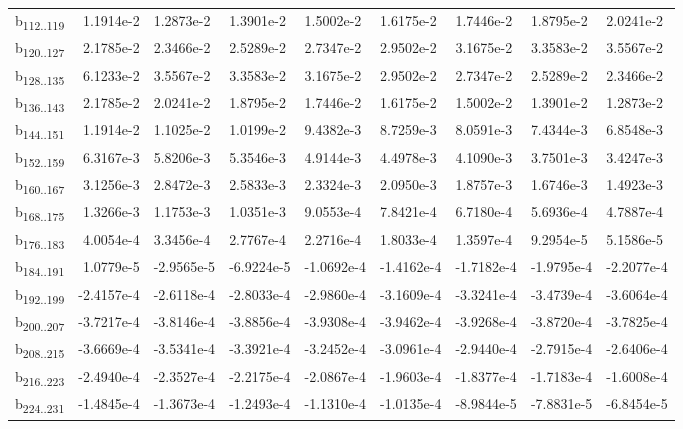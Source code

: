 \begin{table}
{\begin{tabular}{lrlllllll}
        b\textsubscript{112..119} & 1.1914e-2 & 1.2873e-2 & 1.3901e-2 & 1.5002e-2 & 1.6175e-2 & 1.7446e-2 & 1.8795e-2 & 2.0241e-2 \\
        b\textsubscript{120..127} & 2.1785e-2 & 2.3466e-2 & 2.5289e-2 & 2.7347e-2 & 2.9502e-2 & 3.1675e-2 & 3.3583e-2 & 3.5567e-2 \\
        b\textsubscript{128..135} & 6.1233e-2 & 3.5567e-2 & 3.3583e-2 & 3.1675e-2 & 2.9502e-2 & 2.7347e-2 & 2.5289e-2 & 2.3466e-2 \\
        b\textsubscript{136..143} & 2.1785e-2 & 2.0241e-2 & 1.8795e-2 & 1.7446e-2 & 1.6175e-2 & 1.5002e-2 & 1.3901e-2 & 1.2873e-2 \\
        b\textsubscript{144..151} & 1.1914e-2 & 1.1025e-2 & 1.0199e-2 & 9.4382e-3 & 8.7259e-3 & 8.0591e-3 & 7.4344e-3 & 6.8548e-3 \\
        b\textsubscript{152..159} & 6.3167e-3 & 5.8206e-3 & 5.3546e-3 & 4.9144e-3 & 4.4978e-3 & 4.1090e-3 & 3.7501e-3 & 3.4247e-3 \\
        b\textsubscript{160..167} & 3.1256e-3 & 2.8472e-3 & 2.5833e-3 & 2.3324e-3 & 2.0950e-3 & 1.8757e-3 & 1.6746e-3 & 1.4923e-3 \\
        b\textsubscript{168..175} & 1.3266e-3 & 1.1753e-3 & 1.0351e-3 & 9.0553e-4 & 7.8421e-4 & 6.7180e-4 & 5.6936e-4 & 4.7887e-4 \\
        b\textsubscript{176..183} & 4.0054e-4 & 3.3456e-4 & 2.7767e-4 & 2.2716e-4 & 1.8033e-4 & 1.3597e-4 & 9.2954e-5 & 5.1586e-5 \\
        b\textsubscript{184..191} & 1.0779e-5 & -2.9565e-5 & -6.9224e-5 & -1.0692e-4 & -1.4162e-4 & -1.7182e-4 & -1.9795e-4 & -2.2077e-4 \\
        b\textsubscript{192..199} & -2.4157e-4 & -2.6118e-4 & -2.8033e-4 & -2.9860e-4 & -3.1609e-4 & -3.3241e-4 & -3.4739e-4 & -3.6064e-4 \\
        b\textsubscript{200..207} & -3.7217e-4 & -3.8146e-4 & -3.8856e-4 & -3.9308e-4 & -3.9462e-4 & -3.9268e-4 & -3.8720e-4 & -3.7825e-4 \\
        b\textsubscript{208..215} & -3.6669e-4 & -3.5341e-4 & -3.3921e-4 & -3.2452e-4 & -3.0961e-4 & -2.9440e-4 & -2.7915e-4 & -2.6406e-4 \\
        b\textsubscript{216..223} & -2.4940e-4 & -2.3527e-4 & -2.2175e-4 & -2.0867e-4 & -1.9603e-4 & -1.8377e-4 & -1.7183e-4 & -1.6008e-4 \\
        b\textsubscript{224..231} & -1.4845e-4 & -1.3673e-4 & -1.2493e-4 & -1.1310e-4 & -1.0135e-4 & -8.9844e-5 & -7.8831e-5 & -6.8454e-5 \\

\end{tabular}}
\end{table}
